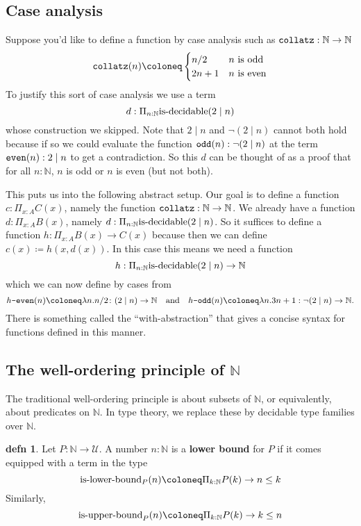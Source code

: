 \documentclass{amsart}
\theoremstyle{theorem}
\theoremstyle{definition}
\newtheorem*{defn}{defn}
\theoremstyle{remark}
\newcommand{\0}{\mathbbe{0}}
\newcommand{\1}{\mathbbe{1}}
\newcommand{\2}{\mathbbe{2}}
\newcommand{\3}{\mathbbe{3}}
\newcommand{\4}{\mathbbe{4}}
\newcommand{\term}[1]{{\textup{\texttt{#1}}}}
\newcommand{\type}[1]{{\textup{#1}}}
\newcommand{\bN}{{\mathbb{N}}}
\newcommand{\UU}{{\mathcal{U}}}
\begin{document}
\subsection*{Case analysis}

Suppose you'd like to define a function by case analysis such as $\term{collatz} : \bN \to \bN$
\[ \term{collatz}(n) \coloneq \begin{cases} n/2 & n\ \text{is~odd} \\ 2n+1 & n\ \text{is~even} \end{cases}\]
To justify this sort of case analysis we use a term
\[ d : \Pi_{n : \bN} \type{is-decidable} (2 \mid n)\]
whose construction we skipped. Note that $2 \mid n$ and $\neg(2 \mid n)$ cannot both hold because if so we could evaluate the function $\term{odd}(n) : \neg(2 \mid n)$ at the term $\term{even}(n) : 2 \mid n$ to get a contradiction. So this $d$ can be thought of as a proof that for all $n : \bN$, $n$ is odd or $n$ is even (but not both).

This puts us into the following abstract setup. Our goal is to define a function $c : \Pi_{x :A} C(x)$, namely the function $\term{collatz} : \bN \to \bN$. We already have a function $d : \Pi_{x :A} B(x)$, namely $d : \Pi_{n : \bN} \type{is-decidable}(2 \mid n)$. So it suffices to define a function $h : \Pi_{x:A} B(x) \to C(x)$ because then we can define $c(x) \coloneq h(x,d(x))$. In this case this means we need a function
\[ h : \Pi_{n : \bN} \type{is-decidable} (2 \mid n) \to \bN\] which we can now define by cases from
\[ h\term{-even}(n) \coloneq \lambda n. n/2 \colon (2 \mid n) \to \bN \quad \text{and} \quad h\term{-odd}(n) \coloneq \lambda n. 3n+1 : \neg(2 \mid n) \to \bN.\]
There is something called the ``with-abstraction'' that gives a concise syntax for functions defined in this manner.

\subsection*{The well-ordering principle of $\bN$}

The traditional well-ordering principle is about subsets of $\bN$, or equivalently, about predicates on $\bN$. In type theory, we replace these by decidable type families over $\bN$.

\begin{defn} Let $P \colon \bN \to \UU$. A number $n : \bN$ is a \textbf{lower bound} for $P$ if it comes equipped with a term in the type
  \[ \type{is-lower-bound}_{P}(n) \coloneq \Pi_{k : \bN} P(k) \to n \leq k\]
  Similarly,
  \[ \type{is-upper-bound}_{P}(n) \coloneq \Pi_{k : \bN} P(k) \to k \leq n\]
  \end{defn}
\end{document}
